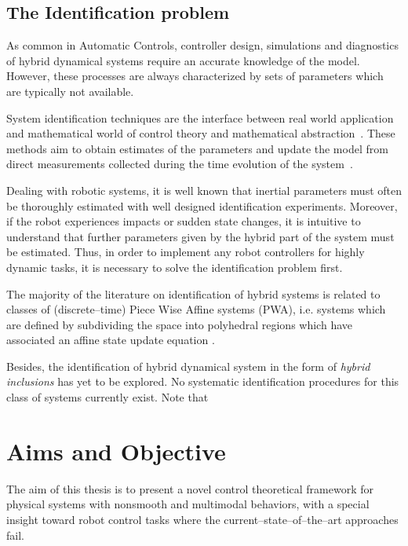 \subsection{The Identification problem}
%
As common in Automatic Controls, controller design, simulations and diagnostics of hybrid dynamical systems require an accurate knowledge of the model. However, these {processes} are always characterized by sets of parameters which are typically not available.
%
\newline

%
System identification techniques are the interface between real world application and mathematical world of control theory and mathematical abstraction~\cite{LJUNG20101}. These methods aim to obtain estimates of the parameters and update the model from direct measurements collected during the time evolution of the system~\cite{SIS}.
%
\newline

%
Dealing with robotic systems, it is well known that inertial parameters must often be thoroughly estimated with well designed identification experiments. Moreover, if the robot experiences impacts or sudden state changes, it is intuitive to understand that further parameters given by the hybrid part of the system must be estimated. 
Thus, in order to implement any robot controllers for highly dynamic tasks, it is necessary to solve the identification problem first.
%
\newline

%
The majority of the literature on identification of hybrid systems is related to classes of (discrete--time) Piece Wise Affine systems (PWA), i.e. systems which are defined by subdividing the  space into polyhedral regions which have associated an affine state update equation \cite{Juloski,Paoletti,Bemporad,Ferrari, juloski2005bayesian}.
% 
\newline

%
Besides, the identification of hybrid dynamical system in the form of \textit{hybrid inclusions} has yet to be explored. No systematic identification procedures for this class of systems currently exist. Note that
%

\clearpage

\section{{Aims and Objective}}
The aim of this thesis is to present a novel control theoretical framework for physical systems with nonsmooth and multimodal behaviors, with a special insight toward robot control tasks where the current--state--of--the--art approaches fail.

